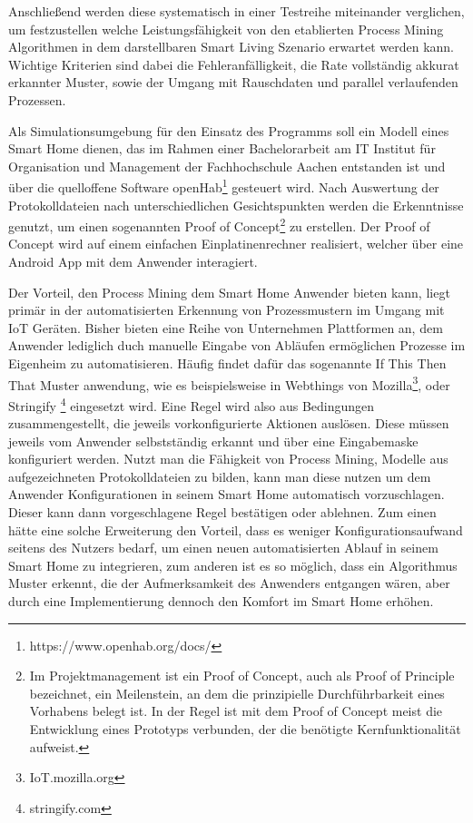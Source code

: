 Anschließend werden diese systematisch in einer Testreihe miteinander verglichen, um festzustellen welche Leistungsfähigkeit von den etablierten Process Mining Algorithmen in dem darstellbaren Smart Living Szenario erwartet werden kann. Wichtige Kriterien sind dabei die Fehleranfälligkeit, die Rate vollständig akkurat erkannter Muster, sowie der Umgang mit Rauschdaten und parallel verlaufenden Prozessen.

Als Simulationsumgebung für den Einsatz des Programms soll ein Modell eines Smart Home dienen, das im Rahmen einer Bachelorarbeit am IT Institut für Organisation und Management der Fachhochschule Aachen entstanden ist und über die quelloffene Software openHab\footnote{https://www.openhab.org/docs/} gesteuert wird. Nach Auswertung der Protokolldateien nach unterschiedlichen Gesichtspunkten werden die Erkenntnisse genutzt, um einen sogenannten Proof of Concept\footnote{Im Projektmanagement ist ein Proof of Concept, auch als Proof of Principle bezeichnet, ein Meilenstein, an dem die prinzipielle Durchführbarkeit eines Vorhabens belegt ist. In der Regel ist mit dem Proof of Concept meist die Entwicklung eines Prototyps verbunden, der die benötigte Kernfunktionalität aufweist.\cite{poc}} zu erstellen. Der Proof of Concept wird auf einem einfachen Einplatinenrechner realisiert, welcher über eine Android App mit dem Anwender interagiert.

Der Vorteil, den Process Mining dem Smart Home Anwender bieten kann, liegt primär in der automatisierten Erkennung von Prozessmustern im Umgang mit IoT Geräten. Bisher bieten eine Reihe von Unternehmen Plattformen an, dem Anwender lediglich duch manuelle Eingabe von Abläufen ermöglichen Prozesse im Eigenheim zu automatisieren. Häufig findet dafür das sogenannte If This Then That Muster anwendung, wie es beispielsweise in Webthings von Mozilla\footnote{IoT.mozilla.org},  oder Stringify \footnote{stringify.com} eingesetzt wird. 
\newpage
Eine Regel wird also aus Bedingungen zusammengestellt, die jeweils vorkonfigurierte Aktionen auslösen. Diese müssen jeweils vom Anwender selbstständig erkannt und über eine Eingabemaske konfiguriert werden. Nutzt man die Fähigkeit von Process Mining, Modelle aus aufgezeichneten Protokolldateien zu bilden, kann man diese nutzen um dem Anwender Konfigurationen in seinem Smart Home automatisch vorzuschlagen. Dieser kann dann vorgeschlagene Regel bestätigen oder ablehnen. Zum einen hätte eine solche Erweiterung den Vorteil, dass es weniger Konfigurationsaufwand seitens des Nutzers bedarf, um einen neuen automatisierten Ablauf in seinem Smart Home zu integrieren, zum anderen ist es so möglich, dass ein Algorithmus Muster erkennt, die der Aufmerksamkeit des Anwenders entgangen wären, aber durch eine Implementierung dennoch den Komfort im Smart Home erhöhen.

